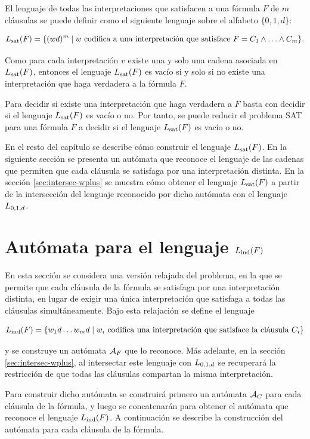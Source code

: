 El lenguaje de todas las interpretaciones que satisfacen a una fórmula $F$ de $m$ cláusulas se puede definir como el siguiente lenguaje sobre el alfabeto $\{0, 1, d\}$:

$$
    L_{\mathrm{sat}}(F) = \{(wd)^m \;|\; w \text{ codifica a una interpretación que satisface } F = C_1 \land \ldots \land C_m \}.
$$


Como para cada interpretación $v$ existe una y solo una cadena asociada en $L_{\mathrm{sat}}(F)$, entonces el lenguaje $L_{\mathrm{sat}}(F)$ es vacío si y solo si no existe una interpretación que haga verdadera a la fórmula $F$.

Para decidir si existe una interpretación que haga verdadera a $F$ basta con decidir si el lenguaje $L_{\mathrm{sat}}(F)$ es vacío o no. Por tanto, se puede reducir el problema SAT para una fórmula $F$ a decidir si el lenguaje $L_{\mathrm{sat}}(F)$ es vacío o no.

En el resto del capítulo se describe cómo construir el lenguaje $L_{\mathrm{sat}}(F)$. En la siguiente sección se presenta un autómata que reconoce el lenguaje de las cadenas que permiten que cada cláusula se satisfaga por una interpretación distinta. En la sección \ref{sec:intersec-wplus} se muestra cómo obtener el lenguaje $L_{\mathrm{sat}}(F)$ a partir de la intersección del lenguaje reconocido por dicho autómata con el lenguaje $L_{0,1,d} $.

\section{Autómata para el lenguaje $L_{\mathrm{ind}}(F)$}
\label{sec:automata-cnf}

En esta sección se considera una versión relajada del problema, en la que se permite que cada cláusula de la fórmula se satisfaga por una interpretación distinta, en lugar de exigir una única interpretación que satisfaga a todas las cláusulas simultáneamente. Bajo esta relajación se define el lenguaje

$$
    L_{\mathrm{ind}}(F) = \{ w_1 d \ldots  w_m d \;|\; w_i \text{ codifica una interpretación que satisface la cláusula } C_i\}
$$

y se construye un autómata $\mathcal{A}_{F}$ que lo reconoce. Más adelante, en la sección \ref{sec:intersec-wplus}, al intersectar este lenguaje con $L_{0,1,d}$ se recuperará la restricción de que todas las cláusulas compartan la misma interpretación.


Para construir dicho autómata se construirá primero un autómata $\mathcal{A}_C$ para cada cláusula de la fórmula, y luego se concatenarán para obtener el autómata que reconoce el lenguaje $L_{\mathrm{ind}}(F)$. A continuación se describe la construcción del autómata para cada cláusula de la fórmula.


